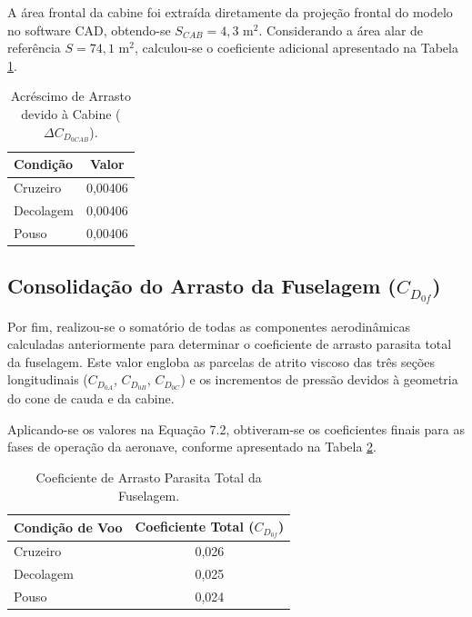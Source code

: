 A área frontal da cabine foi extraída diretamente da projeção frontal do modelo no software CAD, obtendo-se $S_{CAB} = 4,3 \text{ m}^2$. Considerando a área alar de referência $S = 74,1\text{ m}^2$, calculou-se o coeficiente adicional apresentado na Tabela \ref{tab:arrasto_cabine}.

\begin{table}[H]
    \centering
    \caption{Acréscimo de Arrasto devido à Cabine ($\Delta C_{D_{0CAB}}$).}
    \vspace{0.2cm}
    \begin{tabular}{lc}
        \toprule
        \textbf{Condição} & \textbf{Valor} \\
        \midrule
        Cruzeiro & 0,00406 \\
        Decolagem & 0,00406 \\
        Pouso & 0,00406 \\
        \bottomrule
    \end{tabular}
    \label{tab:arrasto_cabine}
\end{table}

\subsection{Consolidação do Arrasto da Fuselagem ($C_{D_{0f}}$)}

Por fim, realizou-se o somatório de todas as componentes aerodinâmicas calculadas anteriormente para determinar o coeficiente de arrasto parasita total da fuselagem. Este valor engloba as parcelas de atrito viscoso das três seções longitudinais ($C_{D_{0A}}$, $C_{D_{0B}}$, $C_{D_{0C}}$) e os incrementos de pressão devidos à geometria do cone de cauda e da cabine.

Aplicando-se os valores na Equação 7.2, obtiveram-se os coeficientes finais para as fases de operação da aeronave, conforme apresentado na Tabela \ref{tab:arrasto_fuselagem_total}.

\begin{table}[H]
    \centering
    \caption{Coeficiente de Arrasto Parasita Total da Fuselagem.}
    \vspace{0.2cm}
    \begin{tabular}{lc}
        \toprule
        \textbf{Condição de Voo} & \textbf{Coeficiente Total ($C_{D_{0f}}$)} \\
        \midrule
        Cruzeiro & 0,026 \\
        Decolagem & 0,025 \\
        Pouso & 0,024 \\
        \bottomrule
    \end{tabular}
    \label{tab:arrasto_fuselagem_total}
\end{table}

